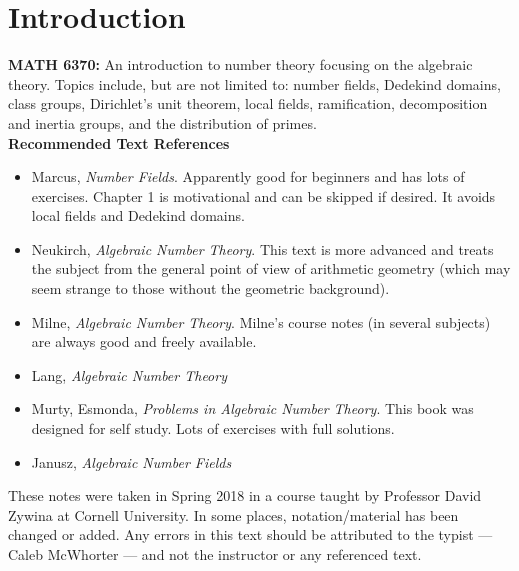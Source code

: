 \section{Introduction}

\noindent\textbf{MATH 6370:} An introduction to number theory focusing on the algebraic theory. Topics include, but are not limited to: number fields, Dedekind domains, class groups, Dirichlet's unit theorem, local fields, ramification, decomposition and inertia groups, and the distribution of primes. \\

\noindent \textbf{Recommended Text References}

\begin{itemize}
\item Marcus, \emph{Number Fields}. Apparently good for beginners and has lots of exercises. Chapter 1 is motivational and can be skipped if desired. It avoids local fields and Dedekind domains.

\item Neukirch, \emph{Algebraic Number Theory}. This text is more advanced and treats the subject from the general point of view of arithmetic geometry (which may seem strange to those without the geometric background).

\item Milne, \emph{Algebraic Number Theory}. Milne's course notes (in several subjects) are always good and freely available.

\item Lang, \emph{Algebraic Number Theory}

\item Murty, Esmonda, \emph{Problems in Algebraic Number Theory}. This book was designed for self study. Lots of exercises with full solutions.

\item Janusz, \emph{Algebraic Number Fields}
\end{itemize}

These notes were taken in Spring 2018 in a course taught by Professor David Zywina at Cornell University. In some places, notation/material has been changed or added. Any errors in this text should be attributed to the typist --- Caleb McWhorter --- and not the instructor or any referenced text. 